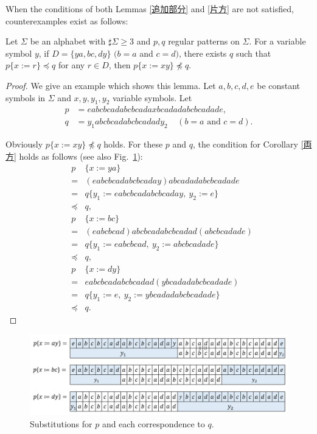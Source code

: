 When the conditions of both Lemmas \ref{追加部分} and \ref{片方} are not satisfied, counterexamples exist as follows:

\begin{lem}\label{両方}
  Let $\Sigma$ be an alphabet with $\sharp \Sigma \ge 3$ and $p, q$ regular patterns on $\Sigma$.
  For a variable symbol $y$, if $D= \{ ya, bc, dy \}$ $(b = a$ and $c = d)$, there exists $q$ such that $p \{ x := r \} \preceq q$ for any $r \in D$, then $p \{ x := xy \} \not \preceq q$.
\end{lem}

\begin{proof}
We give an example which shows this lemma.
Let $a,b,c,d,e$ be constant symbols in $\Sigma$ and 
$x,y,y_{1},y_{2}$ variable symbols.
Let 
\begin{align*}
p &= eabcbcadabcbcadaxbcadadabcbcadade,\\
q &= y_{1}abcbcadabcbcadady_{2}~~~~~(b = a\mbox{~and~}c = d).
\end{align*}

\noindent
Obviously $p \{ x:=xy \} \not \preceq q$ holds.
For these $p$ and $q$, the condition for Corollary \ref{両方} holds as follows (see also Fig.~\ref{b=aとc=dの例}):
\begin{eqnarray*}
&p& \{ x:=ya \} \\ 
& = & (eabcbcadabcbcaday)abcadadabcbcadade\\
& = & q \{ y_{1} := eabcbcadabcbcaday,~y_{2}:=e \} \\
& \preceq & q,\\
&p& \{ x:=bc \}  \\
& = & (eabcbcad)abcbcadabcbcadad(abcbcadade) \\
& = & q \{ y_{1} := eabcbcad,~y_{2} := abcbcadade \} \\
& \preceq & q,\\
&p& \{ x:=dy \}  \\
& = & eabcbcadabcbcadad(ybcadadabcbcadade) \\
& = & q \{ y_{1}:=e,~y_{2} := ybcadadabcbcadade \} \\
& \preceq & q.
\end{eqnarray*}
\end{proof}

\begin{figure}[t]
\begin{center}
\includegraphics[scale=0.45]{figs/Exam_b=a_c=d.png}
\end{center}
\caption{Substitutions for $p$ and each correspondence to $q$.}
\label{b=aとc=dの例}
\end{figure}


